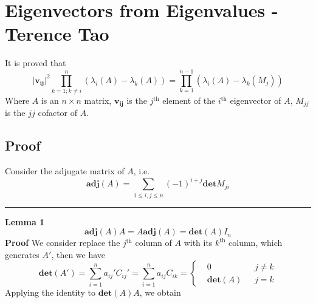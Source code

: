 \documentclass[11pt]{article}
\begin{document}
\section{Eigenvectors from Eigenvalues - Terence Tao}
It is proved that
\begin{equation}
    \lvert \bm{v_{ij}} \rvert^2 \prod_{k=1;k\neq i}^n (\lambda_i(A) -  \lambda_k (A)) = \prod_{k=1}^{n-1}(\lambda_i(A) - \lambda_k(M_j))
\end{equation}
Where $A$ is an $n \times n$ matrix, $\bm{v_{ij}}$ is the $j^{\text{th}}$ element of the $i^{\text{th}}$ eigenvector of $A$, $M_{jj}$ is the $jj$ cofactor of $A$.
\subsection{Proof}
Consider the adjugate matrix of $A$, i.e.
\begin{equation}
    \bm{adj}(A) = \sum_{1 \leq i,j \leq n}(-1)^{i+j}\bm{det}M_{ji}
\end{equation}
\rule{1\textwidth}{0.3mm} \par \noindent
\textbf{Lemma 1}
\begin{equation}
    \bm{adj}(A) A = A\bm{adj}(A) = \bm{det}(A)I_n
\end{equation}
\textbf{Proof} We consider replace the $j^{\text{th}}$ column of $A$ with its $k^{\text{th}}$ column, which generates $A'$, then we have
\begin{equation}
     \bm{det}(A') = \sum_{i=1}^n a_{ij}'C_{ij}' = \sum_{i=1}^n a_{ij}C_{ik}= \left\{ \begin{aligned} &0~~~~~~&j\neq k\\ &\bm{det}(A)~~~&j=k  \end{aligned}\right.
     \end{equation}
Applying the identity to $\bm{det}(A)A$, we obtain
\end{document}
